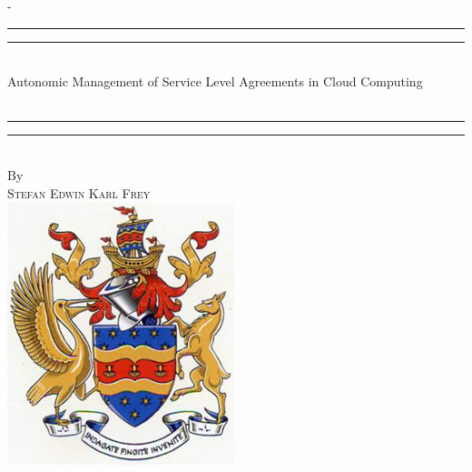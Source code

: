 %
%
% 
%
%
\begin{titlingpage}
\begin{SingleSpace}
\calccentering{\unitlength} 
\begin{adjustwidth*}{\unitlength}{-\unitlength}
\vspace*{13mm}
\begin{center}
\rule[0.5ex]{\linewidth}{2pt}\vspace*{-\baselineskip}\vspace*{3.2pt}
\rule[0.5ex]{\linewidth}{1pt}\\[\baselineskip]
{\HUGE Autonomic Management of  Service Level Agreements in Cloud Computing}\\[4mm]
{\Large \textit{}}\\
\rule[0.5ex]{\linewidth}{1pt}\vspace*{-\baselineskip}\vspace{3.2pt}
\rule[0.5ex]{\linewidth}{2pt}\\
\vspace{6.5mm}
{\large By}\\
\vspace{6.5mm}
{\large\textsc{Stefan Edwin Karl Frey}}\\
\vspace{11mm}
\includegraphics[scale=0.6]{logos/coat_of_arms.jpg}\\

\end{center}
\end{adjustwidth*}
\end{SingleSpace}
\end{titlingpage}

